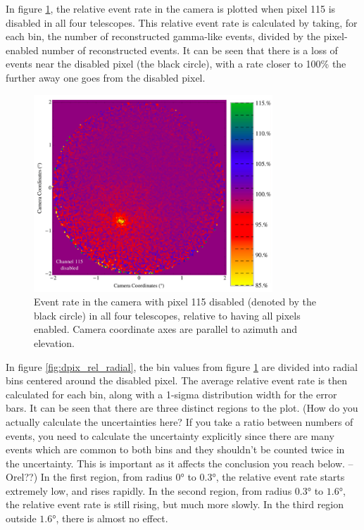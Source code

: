In figure \ref{fig:dpix_rel_camera}, the relative event rate in the camera is plotted when pixel 115 is disabled in all four telescopes.
This relative event rate is calculated by taking, for each bin, the number of reconstructed gamma-like events, divided by the pixel-enabled number of reconstructed events.
It can be seen that there is a loss of events near the disabled pixel (the black circle), with a rate closer to 100\% the further away one goes from the disabled pixel.

\begin{figure}[ht]
  \begin{center}
    \includegraphics[width=0.8\textwidth]{images/disabled_pixel/relativerate_camera}
    \caption[Relative Event Rate]{Event rate in the camera with pixel 115 disabled (denoted by the black circle) in all four telescopes, relative to having all pixels enabled.  Camera coordinate axes are parallel to azimuth and elevation.}\label{fig:dpix_rel_camera}
  \end{center}
\end{figure}

In figure \ref{fig:dpix_rel_radial}, the bin values from figure \ref{fig:dpix_rel_camera} are divided into radial bins centered around the disabled pixel.
The average relative event rate is then calculated for each bin, along with a 1-sigma distribution width for the error bars.
It can be seen that there are three distinct regions to the plot.
(How do you actually calculate the uncertainties here? If you take a ratio between numbers of events, you need to calculate the uncertainty explicitly since there are many events which are common to both bins and they shouldn’t be counted twice in the uncertainty.  This is important as it affects the conclusion you reach below. --Orel??)
In the first region, from radius $\ang{0}$ to $\ang{0.3}$, the relative event rate starts extremely low, and rises rapidly.
In the second region, from radius $\ang{0.3}$ to $\ang{1.6}$, the relative event rate is still rising, but much more slowly.
In the third region outside $\ang{1.6}$, there is almost no effect.

